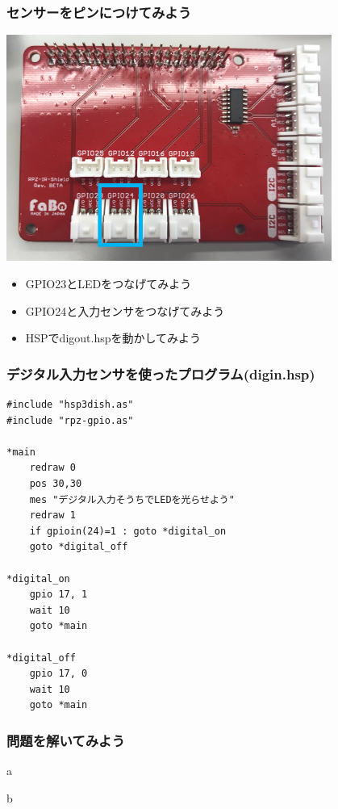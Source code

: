 \begin{frame}
    \frametitle{センサーをピンにつけてみよう}
    \begin{center}
        \includegraphics[width=0.8\textwidth]{images/chap05/text05-img029.png}
        \begin{itemize}
            \item GPIO23とLEDをつなげてみよう
            \item GPIO24と入力センサをつなげてみよう
            \item HSPでdigout.hspを動かしてみよう
        \end{itemize}
    \end{center}
\end{frame}

\begin{frame}[fragile]
    \frametitle{デジタル入力センサを使ったプログラム(digin.hsp)}
\begin{lstlisting}
#include "hsp3dish.as"
#include "rpz-gpio.as"

*main
	redraw 0
	pos 30,30
	mes "デジタル入力そうちでLEDを光らせよう"
	redraw 1
	if gpioin(24)=1 : goto *digital_on
	goto *digital_off
        
*digital_on
	gpio 17, 1
	wait 10
	goto *main

*digital_off
	gpio 17, 0
	wait 10
	goto *main 
\end{lstlisting}
\end{frame}

\begin{frame}[fragile]
    \frametitle{問題を解いてみよう}
    \begin{description}
        \item a
        \item b
    \end{description}
\end{frame}
